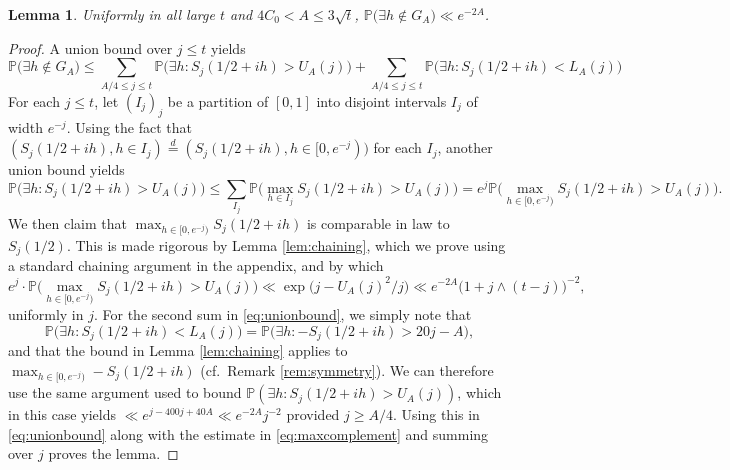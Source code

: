 \documentclass{amsart}
\newtheorem{lemma}[theorem]{Lemma}
\theoremstyle{definition}
\theoremstyle{remark}
\numberwithin{equation}{section}
\begin{document}
\begin{lemma}\label{lem:goodevent} Uniformly in all large $t$ and $4C_0<A\leq 3 \sqrt{t}$, $\mathbb{P}\big(\exists h\notin G_A \big) \ll e^{-2A}$.
\end{lemma}
\begin{proof} 
    A union bound over $j\leq t$ yields
    \begin{equation}\label{eq:unionbound}
        \mathbb{P}\big(\exists h\notin G_A \big)\leq  \sum_{A/4\leq j\leq t} \mathbb{P}\big(\exists h: S_j(1/2+ih)>U_A(j)\big)+\sum_{A/4\leq j\leq t}\mathbb{P}\big(\exists h: S_j(1/2+ih)<L_A(j)\big)
    \end{equation}
    For each $j\leq t$, let $(I_j)_j$ be a partition of $[0,1]$ into disjoint intervals $I_j$ of width $e^{-j}$. Using the fact that $(S_j(1/2+ih), h\in I_j)\overset{d}{=}(S_j(1/2+ih), h\in [0,e^{-j}))$ for each $I_j$, another union bound yields
    \[
        \mathbb{P}\big(\exists h: S_j(1/2+ih)>U_A(j)\big) \leq \sum_{I_j} \mathbb{P}\big(\max_{h\in I_j} S_j(1/2+ih)>U_A(j)\big) = e^j \mathbb{P}\big(\max_{h\in [0,e^{-j})} S_j(1/2+ih)>U_A(j)\big).
    \]
    We then claim that $\max_{h\in [0,e^{-j})}S_j(1/2+ih)$ is comparable in law to $S_j(1/2)$. This is made rigorous by Lemma \ref{lem:chaining}, which we prove using a standard chaining argument in the appendix, and by which
    \begin{equation}\label{eq:maxcomplement}
        e^j\cdot \mathbb{P}\big(\max_{h\in [0,e^{-j})} S_j(1/2+ih)>U_A(j)\big) \ll \exp\big(j-U_A(j)^2/j\big) \ll e^{-2A} \big(1+j\land (t-j)\big)^{-2},
    \end{equation}
    uniformly in $j$. For the second sum in \eqref{eq:unionbound}, we simply note that
    \begin{equation}\label{eq:mincomplement}
        \mathbb{P}\big(\exists h: S_j(1/2+ih)<L_A(j)\big)= \mathbb{P}\big(\exists h: -S_j(1/2+ih)>20j-A\big),
    \end{equation}
    and that the bound in Lemma \ref{lem:chaining} applies to $\max_{h\in [0,e^{-j})}-S_j(1/2+ih)$ (cf.\ Remark \ref{rem:symmetry}). We can therefore use the same argument  used to bound $\mathbb{P}(\exists h:S_j(1/2+ih)>U_A(j))$, which in this case yields $\ll e^{j-400j+40A}\ll e^{-2A}j^{-2}$ provided $j\geq A/4$. Using this in \eqref{eq:unionbound} along with the estimate in \eqref{eq:maxcomplement} and summing over $j$ proves the lemma.
\end{proof}
\end{document}
